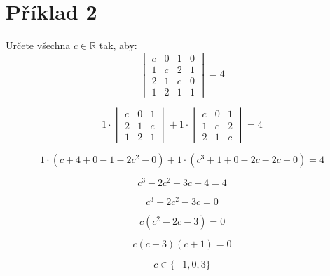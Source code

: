 \section*{Příklad 2}
Určete všechna $c \in \mathbb{R}$ tak, aby:
$$
  \begin{vmatrix}
    c & 0 & 1 & 0 \\
    1 & c & 2 & 1 \\
    2 & 1 & c & 0 \\
    1 & 2 & 1 & 1
  \end{vmatrix}
  = 4
$$

$$
  1 \cdot
  \begin{vmatrix}
    c & 0 & 1 \\
    2 & 1 & c \\
    1 & 2 & 1
  \end{vmatrix}
  + 1 \cdot
  \begin{vmatrix}
    c & 0 & 1 \\
    1 & c & 2 \\
    2 & 1 & c
  \end{vmatrix}
  = 4
$$

$$
  1 \cdot (c + 4 + 0 - 1 - 2c^2 - 0) +
  1 \cdot (c^3 + 1 + 0 - 2c - 2c - 0)
  = 4
$$

$$
  c^3 - 2c^2 - 3c + 4 = 4
$$

$$
  c^3 - 2c^2 - 3c = 0
$$

$$
  c(c^2 - 2c - 3) = 0
$$

$$
  c(c - 3)(c + 1) = 0
$$

$$
  c \in \{ -1, 0, 3 \}
$$
